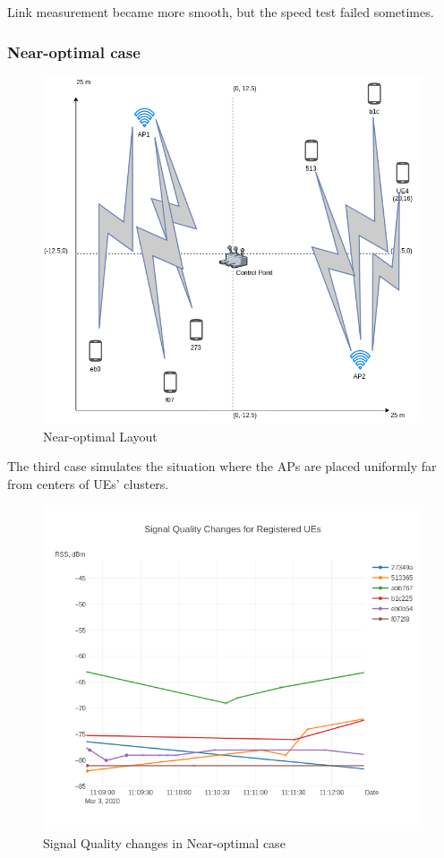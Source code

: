Link measurement became more smooth, but the speed test failed
sometimes.

\hypertarget{near-optimal-case}{%
\subsubsection{Near-optimal case}\label{near-optimal-case}}

\begin{figure}[H]
	\centering
	\includegraphics[width=\linewidth,keepaspectratio]{images/05-cases-description-Exp4-Near-Optimal.png}
\caption{Near-optimal Layout}
\end{figure}

The third case simulates the situation where the APs are placed
uniformly far from centers of UEs' clusters.

\begin{figure}[H]
	\centering
	\includegraphics[width=\linewidth,keepaspectratio]{images/Exp4_Near_Optimal.png}
\caption{Signal Quality changes in Near-optimal case}
\end{figure}

